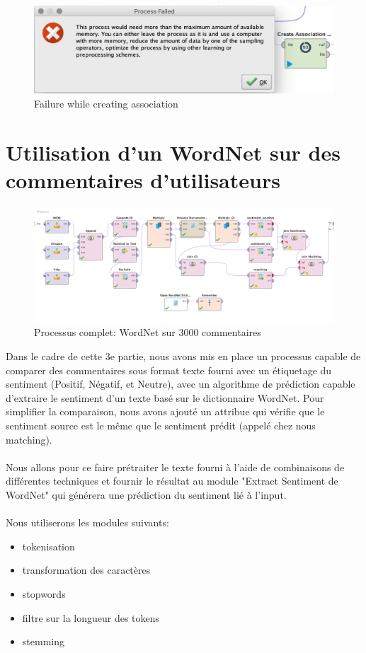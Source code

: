 \documentclass[a4paper]{article}
\begin{document}
\begin{figure}[H]
	\centering
	\includegraphics[width=\linewidth/1]{imgs/part_2/2_fail}
	\caption{Failure while creating association}
	\label{fig:2_fail}
\end{figure}

\vspace{6pt}

\pagebreak
\section{Utilisation d'un WordNet sur des commentaires d’utilisateurs}

\begin{figure}[H]
	\includegraphics[width=\linewidth]{imgs/part_3/3_full_process}
	\caption{Processus complet: WordNet sur 3000 commentaires }
	\label{fig:3_full_process}
\end{figure}

Dans le cadre de cette 3e partie, nous avons mis en place un processus capable de comparer des commentaires sous format texte fourni avec un étiquetage du sentiment (Positif, Négatif, et Neutre), avec un algorithme de prédiction capable d'extraire le sentiment d'un texte basé sur le dictionnaire WordNet. Pour simplifier la comparaison, nous avons ajouté un attribue qui vérifie que le sentiment source est le même que le sentiment prédit (appelé chez nous matching).
\\\\
Nous allons pour ce faire prétraiter le texte fourni à l'aide de combinaisons de différentes techniques et fournir le résultat au module "Extract Sentiment de WordNet" qui générera une prédiction du sentiment lié à l'input.
\\\\
Nous utiliserons les modules suivants:
\begin{itemize}
	\item tokenisation
	\item transformation des caractères
	\item stopwords
	\item filtre sur la longueur des tokens
	\item stemming
\end{itemize}
\end{document}
